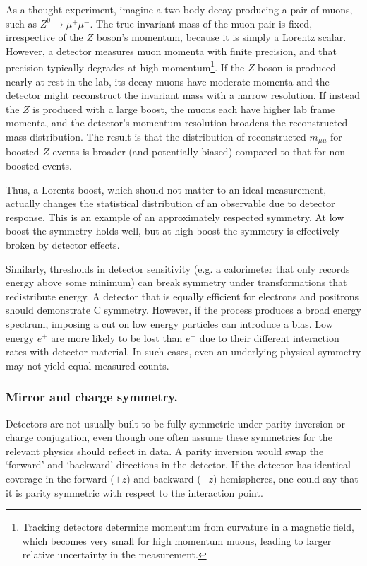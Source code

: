             As a thought experiment, imagine a two body decay producing a pair of muons, such as $Z^0 \to \mu^+\mu^-$.
            The true invariant mass of the muon pair is fixed, irrespective of the $Z$ boson’s momentum, because it is simply a Lorentz scalar.
            However, a detector measures muon momenta with finite precision, and that precision typically degrades at high momentum\footnote{Tracking detectors determine momentum from curvature in a magnetic field, which becomes very small for high momentum muons, leading to larger relative uncertainty in the measurement.}.
            If the $Z$ boson is produced nearly at rest in the lab, its decay muons have moderate momenta and the detector might reconstruct the invariant mass with a narrow resolution.
            If instead the $Z$ is produced with a large boost, the muons each have higher lab frame momenta, and the detector's momentum resolution broadens the reconstructed mass distribution.
            The result is that the distribution of reconstructed $m_{\mu\mu}$ for boosted $Z$ events is broader (and potentially biased) compared to that for non-boosted events.
            
            Thus, a Lorentz boost, which should not matter to an ideal measurement, actually changes the statistical distribution of an observable due to detector response.
            This is an example of an approximately respected symmetry.
            At low boost the symmetry holds well, but at high boost the symmetry is effectively broken by detector effects.
            
            Similarly, thresholds in detector sensitivity (e.g. a calorimeter that only records energy above some minimum) can break symmetry under transformations that redistribute energy.
A detector that is equally efficient for electrons and positrons should demonstrate C symmetry.
%
However, if the process produces a broad energy spectrum, imposing a cut on low energy particles can introduce a bias.
%
Low energy $e^+$ are more likely to be lost than $e^-$ due to their different interaction rates with detector material.
%
In such cases, even an underlying physical symmetry may not yield equal measured counts.

        \subsubsection{Mirror and charge symmetry.}
            Detectors are not usually built to be fully symmetric under parity inversion or charge conjugation, even though one often assume these symmetries for the relevant physics should reflect in data.
            A parity inversion would swap the `forward' and `backward' directions in the detector.
            If the detector has identical coverage in the forward ($+z$) and backward ($-z$) hemispheres, one could say that it is parity symmetric with respect to the interaction point.
            
